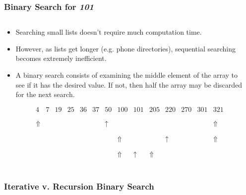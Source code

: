 
\begin{frame}[fragile]
\frametitle{Binary Search for {\em 101}}
\begin{columns}[T]

\begin{column}{0.525\textwidth}
\begin{itemize}[<+->]
\item Searching small lists doesn't require much computation time.
\item However, as lists get longer (e.g. phone directories), sequential searching becomes extremely inefficient.
\item A binary search consists of examining the middle element of the array to see if it has the desired value. If not, then half the array may be discarded for the next search.
\fontsize{4pt}{6.5}\selectfont
\[
\begin{array}{cccccccccccccc}
\\
\\
4 & 7 & 19 & 25 & 36 & 37 & 50 & 100 & 101 & 205 & 220 & 270 & 301 & 321 \\
\\
\\
\Uparrow & & & & & & \uparrow & & & & & & & \Uparrow \\
\\
\\
& & & & & & & \Uparrow & & & \uparrow & & & \Uparrow \\
\\
\\
& & & & & & & \Uparrow & \uparrow & \Uparrow & & & & \\
\end{array}
\]
\end{itemize}
\end{column}

\pause
\begin{column}{0.425\textwidth}

\end{column}

\end{columns}
\end{frame}


\begin{frame}[fragile]
\frametitle{Iterative v. Recursion Binary Search}
\begin{columns}[T]

\begin{column}{0.40\textwidth}

\end{column}

\pause
\begin{column}{0.40\textwidth}

\end{column}

\end{columns}
\end{frame}

